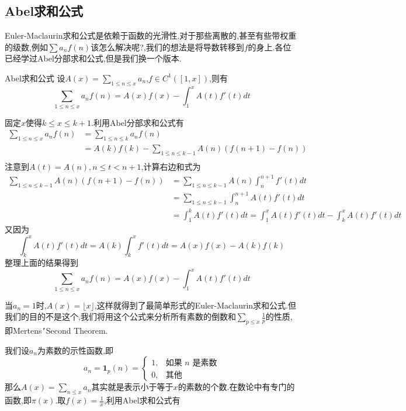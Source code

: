 \documentclass[a4paper,UTF8,12pt]{ctexart}
\begin{document}
\subsection{Abel求和公式}
Euler-Maclaurin求和公式是依赖于函数的光滑性,对于那些离散的,甚至有些带权重的级数,例如$\sum a_nf(n)$该怎么解决呢?,我们的想法是将导数转移到$f$的身上.各位已经学过Abel分部求和公式,但是我们换一个版本\cite{enwiki:1321566893}.\par
\begin{Theorem}{Abel求和公式}
设$A(x)=\sum_{1\leqslant n\leqslant x}a_n$,$f\in C^1([1,x])$,则有
$$
    \sum_{1\leqslant n\leqslant x}a_nf(n) = A(x)f(x) - \int_1^x A(t)f'(t)dt
$$
\end{Theorem}
\begin{Proof}
    固定$x$使得$k\leqslant x\leqslant k+1$.利用Abel分部求和公式有
    $$
    \begin{aligned}
        \sum_{1\leqslant n\leqslant x}a_nf(n) &= \sum_{1\leqslant n\leqslant k}a_nf(n)\\
        &= A(k)f(k)-\sum_{1\leqslant n\leqslant k-1}A(n)(f(n+1)-f(n)) \\
    \end{aligned}
    $$
    注意到$A(t)=A(n),n\leqslant t<n+1$,计算右边和式为
    $$
    \begin{aligned}
        \sum_{1\leqslant n\leqslant k-1}A(n)(f(n+1)-f(n)) &= \sum_{1\leqslant n\leqslant k-1}A(n)\int_n^{n+1}f'(t)dt \\
        &= \sum_{1\leqslant n\leqslant k-1}\int_n^{n+1}A(t)f'(t)dt\\
        &= \int_1^k A(t)f'(t)dt=\int_1^x A(t)f'(t)dt-\int_k^x A(t)f'(t)dt
    \end{aligned}
    $$
    又因为
    $$
    \int_k^x A(t)f'(t)dt= A(k)\int_k^x f'(t)dt=A(x)f(x)-A(k)f(k)
    $$
    整理上面的结果得到
    $$
    \sum_{1\leqslant n\leqslant x}a_nf(n) = A(x)f(x) - \int_1^x A(t)f'(t)dt
    $$
\end{Proof}
当$a_n=1$时,$A(x)=\lfloor x \rfloor$,这样就得到了最简单形式的Euler-Maclaurin求和公式.但我们的目的不是这个,我们将用这个公式来分析所有素数的倒数和$\sum_{p\leqslant x}\frac{1}{p}$的性质,即Mertens\texttt{'}Second Theorem\cite{enwiki:1352898521}\cite{villarino2005mertensproofmertenstheorem}.\par
我们设$a_n$为素数的示性函数,即
$$
a_n=\mathbf{1}_p(n)=
\begin{cases}
1, & \text{如果 $n$ 是素数} \\
0, & \text{其他}
\end{cases}
$$
那么$A(x)=\sum_{n\leqslant x}a_n$其实就是表示小于等于$x$的素数的个数.在数论中有专门的函数,即$\pi(x)$.取$f(x)=\frac{1}{x}$,利用Abel求和公式有
\end{document}
